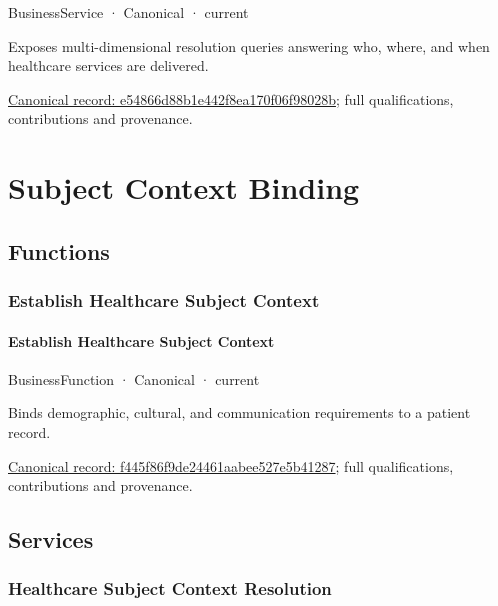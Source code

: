 \label{element:e54866d88b1e442f8ea170f06f98028b}
{\small BusinessService · Canonical · current}\par

Exposes multi-dimensional resolution queries answering who, where, and when healthcare services are delivered.


{\footnotesize \href{../../../../continuum/business/business-service/e54866d88b1e442f8ea170f06f98028b.md}{Canonical record: e54866d88b1e442f8ea170f06f98028b}; full qualifications, contributions and provenance.}\par
\section{Subject Context Binding}

\subsection{Functions}

\subsubsection{Establish Healthcare Subject Context}

\paragraph{Establish Healthcare Subject Context}

\label{element:f445f86f9de24461aabee527e5b41287}
{\small BusinessFunction · Canonical · current}\par

Binds demographic, cultural, and communication requirements to a patient record.


{\footnotesize \href{../../../../continuum/business/business-function/f445f86f9de24461aabee527e5b41287.md}{Canonical record: f445f86f9de24461aabee527e5b41287}; full qualifications, contributions and provenance.}\par
\subsection{Services}

\subsubsection{Healthcare Subject Context Resolution}

